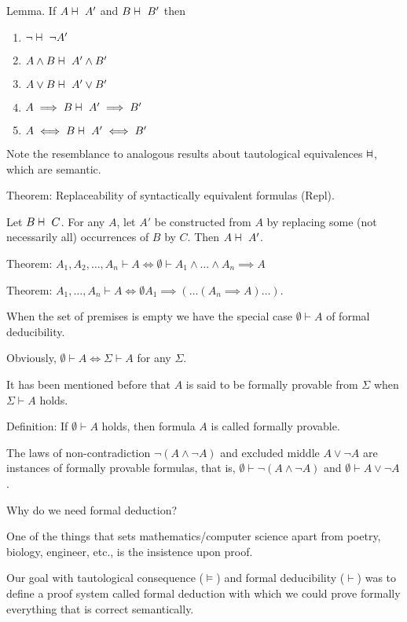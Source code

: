 \documentclass{article}
\newcommand{\vDashv}{%
  \mathrel{%
    \text{%
      \ooalign{$\vDash$\cr\reflectbox{$\vDash$}\cr}%
    }%
  }%
}
\newcommand{\vdashv}{%
    \mathrel{%
        \text{%
            \ooalign{$\vdash$ \cr $\dashv$ \cr}%
        }
    }
}
\begin{document}
Lemma. If $A \vdashv A'$ and $B \vdashv B'$ then
\begin{enumerate}
    \item $\neg \vdashv \neg A'$ 
    \item $A \wedge B \vdashv A' \wedge B'$
    \item $A \vee B \vdashv A' \vee B'$
    \item $A \implies B \vdashv A' \implies B'$
    \item $A \iff B \vdashv A' \iff B'$
\end{enumerate}

Note the resemblance to analogous results about tautological equivalences $\vDashv$, which are semantic.

Theorem: Replaceability of syntactically equivalent formulas (Repl). 

Let $B \vdashv C$. For any $A$, let $A'$ be constructed from $A$ by replacing some (not necessarily all) occurrences of $B$ by $C$. Then $A \vdashv A'$.

Theorem: $A_1, A_2, \ldots, A_n \vdash A \iff \emptyset \vdash A_1 \wedge \ldots \wedge A_n \implies A$ 

Theorem: $A_1, \ldots, A_n \vdash A \iff \emptyset A_1 \implies (\ldots (A_n \implies A) \ldots)$.

When the set of premises is empty we have the special case $\emptyset \vdash A$ of formal deducibility.

Obviously, $\emptyset \vdash A \iff \Sigma \vdash A$ for any $\Sigma$. 

It has been mentioned before that $A$ is said to be formally provable from $\Sigma$ when $\Sigma \vdash A$ holds. 

Definition: If $\emptyset \vdash A$ holds, then formula $A$ is called formally provable. 

The laws of non-contradiction $\neg (A \wedge \neg A)$ and excluded middle $A \vee \neg A$ are instances of formally provable formulas, that is, $\emptyset \vdash \neg (A \wedge \neg A)$ and $\emptyset \vdash A \vee \neg A$.

Why do we need formal deduction?

One of the things that sets mathematics/computer science apart from poetry, biology, engineer, etc., is the insistence upon proof.

Our goal with tautological consequence ($\vDash$) and formal deducibility ($\vdash$) was to define a proof system called formal deduction with which we could prove formally everything that is correct semantically.
\end{document}
